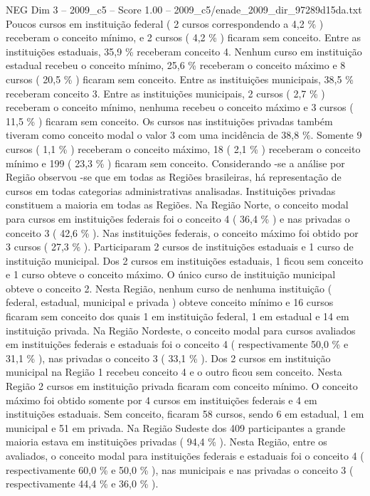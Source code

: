 \begin{textsample}{NEG Dim 3 – 2009\_c5 – Score 1.00 – 2009\_c5/enade\_2009\_dir\_97289d15da.txt}
Poucos cursos em instituição federal ( 2 cursos correspondendo a 4,2 \% ) receberam o conceito mínimo, e 2 cursos ( 4,2 \% ) ficaram sem conceito.
Entre as instituições estaduais, 35,9 \% receberam conceito 4.
Nenhum curso em instituição estadual recebeu o conceito mínimo, 25,6 \% receberam o conceito máximo e 8 cursos ( 20,5 \% ) ficaram sem conceito.
Entre as instituições municipais, 38,5 \% receberam conceito 3.
Entre as instituições municipais, 2 cursos ( 2,7 \% ) receberam o conceito mínimo, nenhuma recebeu o conceito máximo e 3 cursos ( 11,5 \% ) ficaram sem conceito.
Os cursos nas instituições privadas também tiveram como conceito modal o valor 3 com uma incidência de 38,8 \%.
Somente 9 cursos ( 1,1 \% ) receberam o conceito máximo, 18 ( 2,1 \% ) receberam o conceito mínimo e 199 ( 23,3 \% ) ficaram sem conceito.
Considerando -se a análise por Região observou -se que em todas as Regiões brasileiras, há representação de cursos em todas categorias administrativas analisadas.
Instituições privadas constituem a maioria em todas as Regiões.
Na Região Norte, o conceito modal para cursos em instituições federais foi o conceito 4 ( 36,4 \% ) e nas privadas o conceito 3 ( 42,6 \% ).
Nas instituições federais, o conceito máximo foi obtido por 3 cursos ( 27,3 \% ).
Participaram 2 cursos de instituições estaduais e 1 curso de instituição municipal.
Dos 2 cursos em instituições estaduais, 1 ficou sem conceito e 1 curso obteve o conceito máximo.
O único curso de instituição municipal obteve o conceito 2.
Nesta Região, nenhum curso de nenhuma instituição ( federal, estadual, municipal e privada ) obteve conceito mínimo e 16 cursos ficaram sem conceito dos quais 1 em instituição federal, 1 em estadual e 14 em instituição privada.
Na Região Nordeste, o conceito modal para cursos avaliados em instituições federais e estaduais foi o conceito 4 ( respectivamente 50,0 \% e 31,1 \% ), nas privadas o conceito 3 ( 33,1 \% ).
Dos 2 cursos em instituição municipal na Região 1 recebeu conceito 4 e o outro ficou sem conceito.
Nesta Região 2 cursos em instituição privada ficaram com conceito mínimo.
O conceito máximo foi obtido somente por 4 cursos em instituições federais e 4 em instituições estaduais.
Sem conceito, ficaram 58 cursos, sendo 6 em estadual, 1 em municipal e 51 em privada.
Na Região Sudeste dos 409 participantes a grande maioria estava em instituições privadas ( 94,4 \% ).
Nesta Região, entre os avaliados, o conceito modal para instituições federais e estaduais foi o conceito 4 ( respectivamente 60,0 \% e 50,0 \% ), nas municipais e nas privadas o conceito 3 ( respectivamente 44,4 \% e 36,0 \% ).

\end{textsample}

